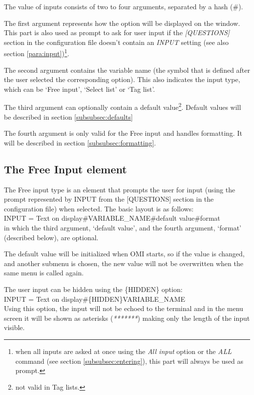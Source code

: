 \documentclass[a4paper]{book}
\newcommand{\vs}{\vspace{3mm}}
\renewcommand{\indent}{\hspace*{5mm}}
\begin{document}
\vs

The value of inputs consists of two to four arguments, separated by a hash 
(\textsf{{\#}}).

The first argument represents how the option will be displayed on the 
window.\\
This part is also used as prompt to ask for user input if the \textsl{[QUESTIONS]} section in the
configuration file doesn't contain an \textsl{INPUT} setting (see also section \ref{para:input})\footnote{ when all inputs are asked
at once using the \textsl{All input} option or the \textsl{ALL} command (see section \ref{subsubsec:entering}), this
part will always be used as prompt.}.

The second argument contains the variable name (the symbol that is defined 
after the user selected the corresponding option). This also indicates the 
input type, which can be `Free input', `Select list' 
or `Tag list'.

The third argument can optionally contain a default value\footnote{ not valid in Tag lists.}.
Default values will be described in section \ref{subsubsec:defaults}

The fourth argument is only valid for the Free input and handles formatting. It will be 
described in section \ref{subsubsec:formatting}.

\subsection{The Free Input element}
\label{subsubsec:mylabel37}

The Free input type is an element that prompts the user for input (using 
the prompt represented by \textsf{INPUT} from the \textsf{[QUESTIONS]} section in the 
configuration file) when selected. The basic layout is as follows:\\
\indent\textsf{INPUT = Text on display{\#}VARIABLE{\_}NAME{\#}default value{\#}format} \\
in which the third argument, `default value', and the fourth argument, 
`format' (described below), are optional.

The default value will be initialized when OMI starts, so if the value is 
changed, and another submenu is chosen, the new value will not be 
overwritten when the same menu is called again.

\vs

The user input can be hidden using the \textsf{\{HIDDEN\}} option:\\ 
\indent\textsf{INPUT = Text on display{\#}\{HIDDEN\}VARIABLE{\_}NAME} \\
Using this option, the input will not be echoed to the terminal and in the menu screen it will be
shown as asterisks (\textsl{*******}) making only the length of the input visible.
\end{document}
